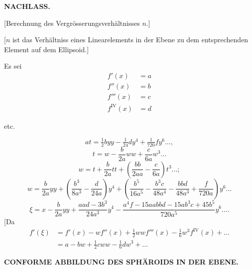 \begingroup
\setlength{\abovedisplayskip}{7pt}
\setlength{\belowdisplayskip}{7pt}
\setlength{\abovedisplayshortskip}{3pt}
\setlength{\belowdisplayshortskip}{4pt}

\par\clearpage
\noindent{}\hfill{\small\textbf{NACHLASS.}}\hfill\null\par\medskip

\begin{center}
[Berechnung des Vergrösserungsverhältnisses \(n\).]\par\medskip
[6.]
\end{center}
[\(n\) ist das Verhältniss eines Linearelements in der Ebene zu dem entsprechenden
Element auf dem Ellipsoid.]

Es sei
\[
\begin{aligned}
f'(x)&=a\\
f''(x)&=b\\
f'''(x)&=c\\
f^{\mathrm{IV}}(x)&=d
\end{aligned}
\]
\centerline{etc.}
\[
at=\tfrac12byy-\tfrac1{24}dy^4+\tfrac1{720}fy^6\ldots,
\]
\noindent [so ist]
\[
t=w-\frac b{2a}ww+\frac c{6a}w^3\ldots
\]
\[
w=t+\frac b{2a}tt+\left(\frac{bb}{2aa}-\frac c{6a}\right)t^3\ldots;
\]
\[
w=\frac b{2a}yy+\left(\frac{b^3}{8a^3}-\frac d{24a}\right)y^4
+\left(\frac{b^5}{16a^5}-\frac{b^3c}{48a^4}-\frac{bbd}{48a^3}+\frac f{720a}\right)y^6\ldots
\]
\noindent [und]
\[
\xi=x-\frac b{2a}yy+\frac{aad-3b^3}{24a^3}y^4
-\frac{a^4f-15aabbd-15ab^3c+45b^5}{720a^5}y^6\ldots.
\]
[Da
\[
\begin{aligned}
f'(\xi)&=f'(x)-wf''(x)+\tfrac12wwf'''(x)-\tfrac16w^3f^{\mathrm{IV}}(x)+\ldots\\
&=a-bw+\tfrac12cww-\tfrac16dw^3+\ldots
\end{aligned}
\]

\par\clearpage
\noindent\null\hfill{\small\textbf{CONFORME ABBILDUNG DES SPHÄROIDS IN DER EBENE.}}\hfill{}\par\medskip

